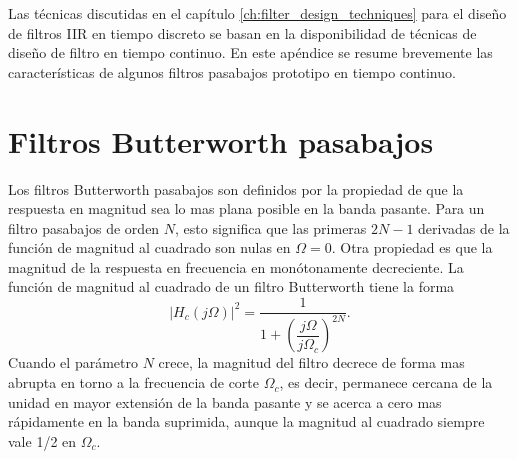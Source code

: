 \documentclass[a4paper]{report}
\begin{document}
Las técnicas discutidas en el capítulo \ref{ch:filter_design_techniques} para el diseño de filtros IIR en tiempo discreto se basan en la disponibilidad de técnicas de diseño de filtro en tiempo continuo. En este apéndice se resume brevemente las características de algunos filtros pasabajos prototipo en tiempo continuo. 

\section{Filtros Butterworth pasabajos}

Los filtros Butterworth pasabajos son definidos por la propiedad de que la respuesta en magnitud sea lo mas plana posible en la banda pasante. Para un filtro pasabajos de orden \(N\), esto significa que las primeras \(2N-1\) derivadas de la función de magnitud al cuadrado son nulas en \(\Omega=0\). Otra propiedad es que la magnitud de la respuesta en frecuencia en monótonamente decreciente. La función de magnitud al cuadrado de un filtro Butterworth tiene la forma 
\begin{equation}\label{eq:continuous_filters_butterworth_squared_magnitude}
 |H_c(j\Omega)|^2=\frac{1}{1+\left(\dfrac{j\Omega}{j\Omega_c}\right)^{2N}}.
\end{equation}
Cuando el parámetro \(N\) crece, la magnitud del filtro decrece de forma mas abrupta en torno a la frecuencia de corte \(\Omega_c\), es decir, permanece cercana de la unidad en mayor extensión de la banda pasante y se acerca a cero mas rápidamente en la banda suprimida, aunque la magnitud al cuadrado siempre vale 1/2 en \(\Omega_c\).
\end{document}
